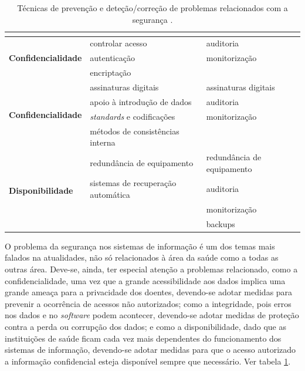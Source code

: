 \documentclass[conference]{IEEEtran}
\begin{document}
\begin{table}[!ht]
\centering
\caption{Técnicas de prevenção e deteção/correção de problemas relacionados com a segurança \cite{segurancaSI}.}
\label{tabl1}
\begin{adjustbox}{max width=\textwidth 	}
\begin{tabular}{ |l|l|l| }

\hline
	\multicolumn{1}{|c|}{\cellcolor[HTML]{EFEFEF}{\color[HTML]{333333}}}	&	\multicolumn{1}{|c|}{\cellcolor[HTML]{EFEFEF}{\color[HTML]{333333} \textbf{Prevenção}}}	&	\multicolumn{1}{|c|}{\cellcolor[HTML]{EFEFEF}{\color[HTML]{333333} \textbf{Deteção/Correção}}}	\\
\hline

\multirow{3}{*}{\textbf{Confidencialidade}}			&	controlar acesso					&	auditoria					\\
													&	autenticação						&	monitorização				\\
													&	encriptação							&								\\
\hline

\multirow{4}{*}{\textbf{Confidencialidade}}			&	assinaturas digitais				&	assinaturas digitais		\\
													&	apoio à introdução de dados			&	auditoria					\\
													&	\textit{standards} e codificações	&	monitorização				\\
													&	métodos de consistências interna	&								\\
\hline

\multirow{4}{*}{\textbf{Disponibilidade}}			&	redundância de equipamento			&	redundância de equipamento	\\
													&	sistemas de recuperação automática	&	auditoria					\\
													&										&	monitorização				\\
													&										&	backups 					\\
\hline

\end{tabular}
\end{adjustbox}
\end{table}

O problema da segurança nos sistemas de informação é um dos temas mais falados na atualidades, não só relacionados à área da saúde como a todas as outras área. Deve-se, ainda, ter especial atenção a problemas relacionado, como a confidencialidade, uma vez que a grande acessibilidade aos dados implica uma grande ameaça para a privacidade dos doentes, devendo-se adotar medidas para prevenir a ocorrência de acessos não autorizados; como a integridade, pois erros nos dados e no \textit{software} podem acontecer, devendo-se adotar medidas de proteção contra a perda ou corrupção dos dados; e como a disponibilidade, dado que as instituições de saúde ficam cada vez mais dependentes do funcionamento dos sistemas de informação, devendo-se adotar medidas para que o acesso autorizado a informação confidencial esteja disponível sempre que necessário. Ver tabela \ref{tabl1}.
\end{document}
